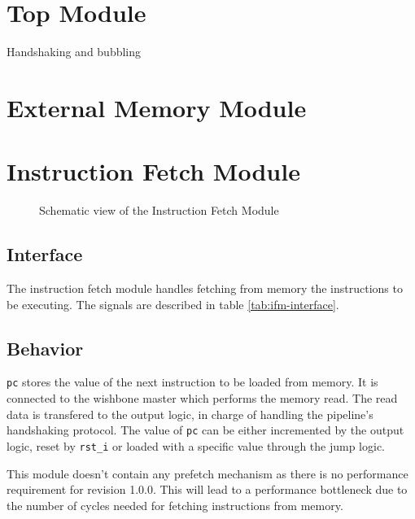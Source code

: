 \newpage

\section{Top Module}

\begin{content}
  Handshaking and bubbling
\end{content}

\newpage

\section{External Memory Module}
\newpage

\section{Instruction Fetch Module}

\begin{figure}[h!]
    \centering
    
    \caption{Schematic view of the Instruction Fetch Module}
    \label{fig:regm}
\end{figure}

\subsection{Interface}

\begin{content}
The instruction fetch module handles fetching from memory the instructions to be executing. The signals are described in table \ref{tab:ifm-interface}. 
\end{content}



\subsection{Behavior}

\begin{content}
  \texttt{pc} stores the value of the next instruction to be loaded from memory. It is connected to the wishbone master which performs the memory read. The read data is transfered to the output logic, in charge of handling the pipeline's handshaking protocol. The value of \texttt{pc} can be either incremented by the output logic, reset by \texttt{rst\_i} or loaded with a specific value through the jump logic.

  This module doesn't contain any prefetch mechanism as there is no performance requirement for revision 1.0.0. This will lead to a performance bottleneck due to the number of cycles needed for fetching instructions from memory.
\end{content}

